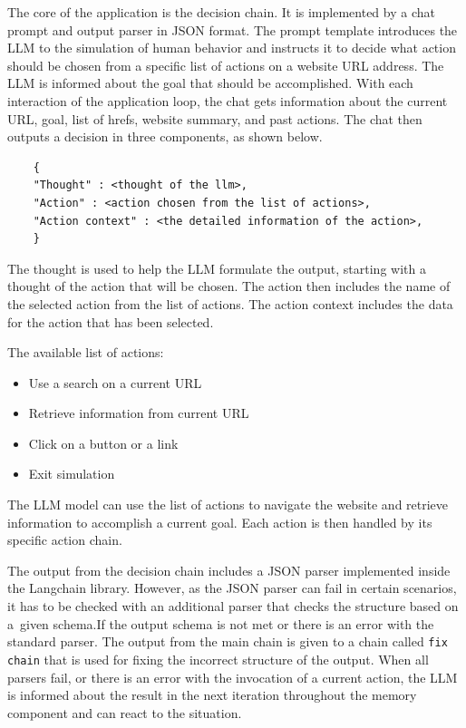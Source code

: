 The core of the application is the decision chain. It is implemented by a chat prompt and output parser in JSON format. The prompt template introduces the LLM to the simulation of human behavior and instructs it to decide what action should be chosen from a specific list of actions on a website URL address. The LLM is informed about the goal that should be accomplished. With each interaction of the application loop, the chat gets information about the current URL, goal, list of hrefs, website summary, and past actions. The chat then outputs a decision in three components, as shown below.

\begin{verbatim}
    {
    "Thought" : <thought of the llm>,
    "Action" : <action chosen from the list of actions>,
    "Action context" : <the detailed information of the action>,
    }
\end{verbatim}

The thought is used to help the LLM formulate the output, starting with a thought of the action that will be chosen. The action then includes the name of the selected action from the list of actions. The action context includes the data for the action that has been selected.

The available list of actions:

\begin{itemize}
    \item Use a search on a current URL
    \item Retrieve information from current URL
    \item Click on a button or a link
    \item Exit simulation
\end{itemize}

The LLM model can use the list of actions to navigate the website and retrieve information to accomplish a current goal. Each action is then handled by its specific action chain.

The output from the decision chain includes a JSON parser implemented inside the Langchain library. However, as the JSON parser can fail in certain scenarios, it has to be checked with an additional parser that checks the structure based on a~given schema.If the output schema is not met or there is an error with the standard parser. The output from the main chain is given to a chain called \verb|fix chain| that is used for fixing the incorrect structure of the output. When all parsers fail, or there is an error with the invocation of a current action, the LLM is informed about the result in the next iteration throughout the memory component and can react to the situation.


